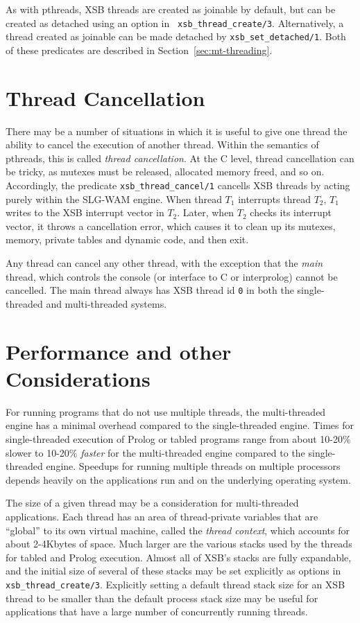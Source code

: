 As with pthreads, XSB threads are created as joinable by default, but
can be created as detached using an option in {\tt
  xsb\_thread\_create/3}.  Alternatively, a thread created as joinable
can be made detached by {\tt xsb\_set\_detached/1}.  Both of these
predicates are described in Section~\ref{sec:mt-threading}.

\section{Thread Cancellation}
%
There may be a number of situations in which it is useful to give one
thread the ability to cancel the execution of another thread.  Within
the semantics of pthreads, this is called {\em thread cancellation}.
At the C level, thread cancellation can be tricky, as mutexes must be
released, allocated memory freed, and so on.  Accordingly, the
predicate {\tt xsb\_thread\_cancel/1} cancells XSB threads by acting
purely within the SLG-WAM engine.  When thread $T_1$ interrupts thread
$T_2$, $T_1$ writes to the XSB interrupt vector in $T_2$.  Later, when
$T_2$ checks its interrupt vector, it throws a cancellation error,
which causes it to clean up its mutexes, memory, private tables and
dynamic code, and then exit.

Any thread can cancel any other thread, with the exception that the
{\em main} thread, which controls the console (or interface to C or
interprolog) cannot be cancelled.  The main thread always has XSB
thread id {\tt 0} in both the single-threaded and multi-threaded
systems.

\section{Performance and other Considerations}
%
For running programs that do not use multiple threads, the
multi-threaded engine has a minimal overhead compared to the
single-threaded engine.  Times for single-threaded execution of Prolog
or tabled programs range from about 10-20\% slower to 10-20\% {\em
  faster} for the multi-threaded engine compared to the
single-threaded engine.  Speedups for running multiple threads on
multiple processors depends heavily on the applications run and on the
underlying operating system.

The size of a given thread may be a consideration for multi-threaded
applications.  Each thread has an area of thread-private variables
that are ``global'' to its own virtual machine, called the {\em thread
  context}, which accounts for about 2-4Kbytes of space.  Much larger
are the various stacks used by the threads for tabled and Prolog
execution.  Almost all of XSB's stacks are fully expandable, and the
initial size of several of these stacks may be set explicitly as
options in {\tt xsb\_thread\_create/3}.  Explicitly setting a default
thread stack size for an XSB thread to be smaller than the default
process stack size may be useful for applications that have a large
number of concurrently running threads.  


